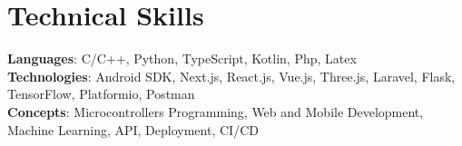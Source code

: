 \section{Technical Skills}
    \begin{itemize}[leftmargin=0.15in, label={}]
	\small{\item{
		\textbf{Languages}{: C/C++, Python, TypeScript, Kotlin, Php, Latex} \\
		\textbf{Technologies}{: Android SDK, Next.js, React.js, Vue.js, Three.js, Laravel, Flask, TensorFlow, Platformio, Postman} \\
		\textbf{Concepts}{: Microcontrollers Programming, Web and Mobile Development, Machine Learning, API, Deployment, CI/CD}
	}}
    \end{itemize}